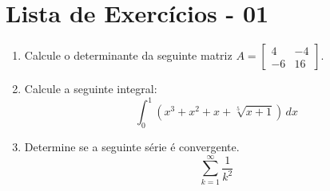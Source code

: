 \documentclass[12pt]{article}
\begin{document}
\section*{Lista de Exercícios - 01}

\begin{enumerate}

\item Calcule o determinante da seguinte matriz $A = 
\begin{bmatrix}
4 & -4 \\
-6 & 16
\end{bmatrix}$.

\item Calcule a seguinte integral:
\[
\int_0^1 \left( x^3 + x^2 + x + \sqrt[5]{x+1} \right) \, dx
\]

\item Determine se a seguinte série é convergente.
\[
\sum_{k=1}^{\infty} \frac{1}{k^2}
\]

\end{enumerate}
\end{document}
